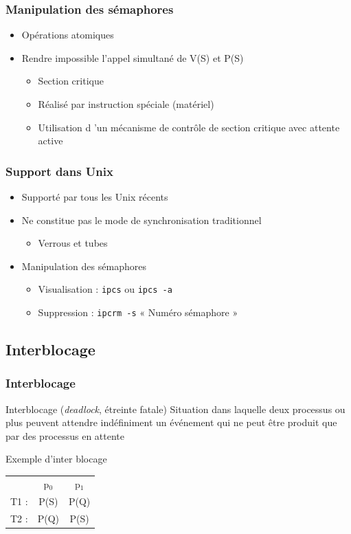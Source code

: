 \begin{frame}
\frametitle{Manipulation des sémaphores}
\begin{itemize}
\item Opérations atomiques
\item Rendre impossible l’appel simultané de V(S) et P(S)
\begin{itemize}
\item Section critique
\item Réalisé par instruction spéciale (matériel)
\item Utilisation d ’un mécanisme de contrôle de section critique avec attente active
\end{itemize}
\end{itemize}
\end{frame}

\begin{frame}
\frametitle{Support dans Unix}
\begin{itemize}
\item Supporté par tous les Unix récents
\item Ne constitue pas le mode de synchronisation traditionnel
\begin{itemize}
\item Verrous et tubes
\end{itemize}
\item Manipulation des sémaphores
\begin{itemize}
\item Visualisation : \texttt{ipcs} ou \texttt{ipcs -a}
\item Suppression : \texttt{ipcrm -s} « Numéro sémaphore »
\end{itemize}
\end{itemize}
\end{frame}

\subsection{Interblocage}

\begin{frame}
\frametitle{Interblocage}
\begin{block}{Interblocage (\textit{deadlock}, étreinte fatale)}
Situation dans laquelle deux processus ou plus peuvent attendre indéfiniment un événement qui ne peut être produit que par des processus en attente
\end{block}
\begin{exampleblock}{Exemple d'inter blocage}
\begin{tabular}{ccc}
 & p$_0$ & p$_1$ \\
T1 : & P(S) & P(Q) \\
T2 : & P(Q) & P(S) \\
\end{tabular}
\end{exampleblock}
\end{frame}

